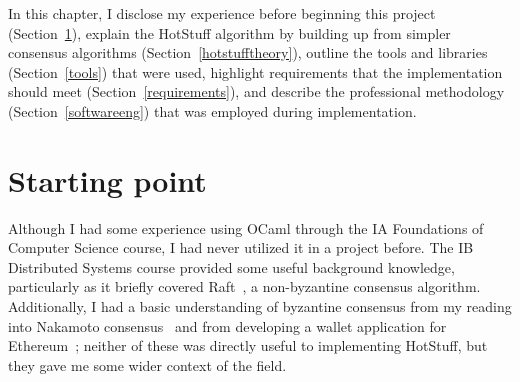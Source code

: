 



In this chapter, I disclose my experience before beginning this project (Section~\ref{start}), explain the HotStuff algorithm by building up from simpler consensus algorithms (Section~\ref{hotstufftheory}), outline the tools and libraries (Section~\ref{tools}) that were used, highlight requirements that the implementation should meet (Section~\ref{requirements}), and describe the professional methodology (Section~\ref{softwareeng}) that was employed during implementation.

\section{Starting point} \label{start}
Although I had some experience using OCaml through the IA Foundations of Computer Science course, I had never utilized it in a project before. The IB Distributed Systems course provided some useful background knowledge, particularly as it briefly covered Raft~\cite{ongaroSearchUnderstandableConsensus2014}, a non-byzantine consensus algorithm. Additionally, I had a basic understanding of byzantine consensus from my reading into Nakamoto consensus~\cite{nakamotoBitcoinPeertoPeerElectronic2008} and from developing a wallet application for Ethereum~\cite{ethereumWhite, ethereumYellow}; neither of these was directly useful to implementing HotStuff, but they gave me some wider context of the field.

